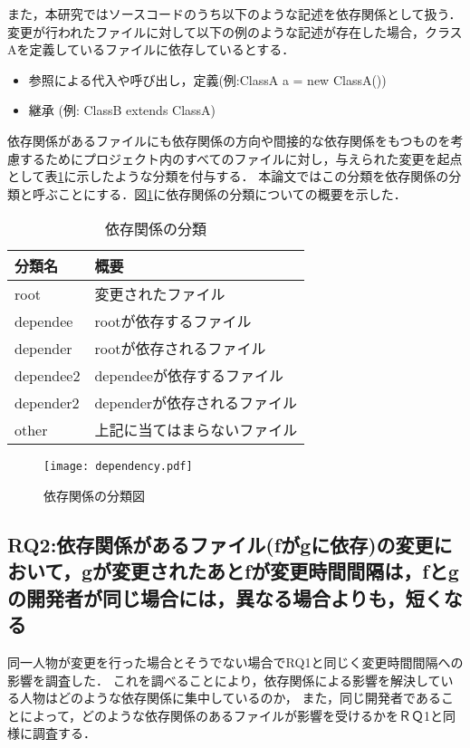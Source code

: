 \documentclass{fose2016}           %
\begin{document}
また，本研究ではソースコードのうち以下のような記述を依存関係として扱う．
変更が行われたファイルに対して以下の例のような記述が存在した場合，クラスAを定義しているファイルに依存しているとする．

\begin{itemize}
\item 参照による代入や呼び出し，定義(例:ClassA a = new ClassA())
\item 継承 (例: ClassB extends ClassA)
\end{itemize}

依存関係があるファイルにも依存関係の方向や間接的な依存関係をもつものを考慮するためにプロジェクト内のすべてのファイルに対し，与えられた変更を起点として表\ref{tab:依存関係の分類}に示したような分類を付与する．
本論文ではこの分類を依存関係の分類と呼ぶことにする．図\ref{fig:dependency}に依存関係の分類についての概要を示した．

\begin{table}
\begin{center}
\caption{依存関係の分類}
\begin{tabular}{|l|l|} \hline
分類名 & 概要 \\ \hline
root & 変更されたファイル \\ \hline
dependee & rootが依存するファイル \\ \hline
depender & rootが依存されるファイル \\ \hline
dependee2 & dependeeが依存するファイル \\ \hline
depender2 & dependerが依存されるファイル \\ \hline
other & 上記に当てはまらないファイル \\ \hline
\end{tabular}
\label{tab:依存関係の分類}
\end{center}
\end{table}

\begin{figure}[t]
\centering
\texttt{[image: dependency.pdf]}
\caption{依存関係の分類図}
\label{fig:dependency} 
\end{figure}

\subsection{RQ2:依存関係があるファイル(fがgに依存)の変更において，gが変更されたあとfが変更時間間隔は，fとgの開発者が同じ場合には，異なる場合よりも，短くなる}
同一人物が変更を行った場合とそうでない場合でRQ1と同じく変更時間間隔への影響を調査した．
これを調べることにより，依存関係による影響を解決している人物はどのような依存関係に集中しているのか，
また，同じ開発者であることによって，どのような依存関係のあるファイルが影響を受けるかをＲＱ1と同様に調査する．
\end{document}
